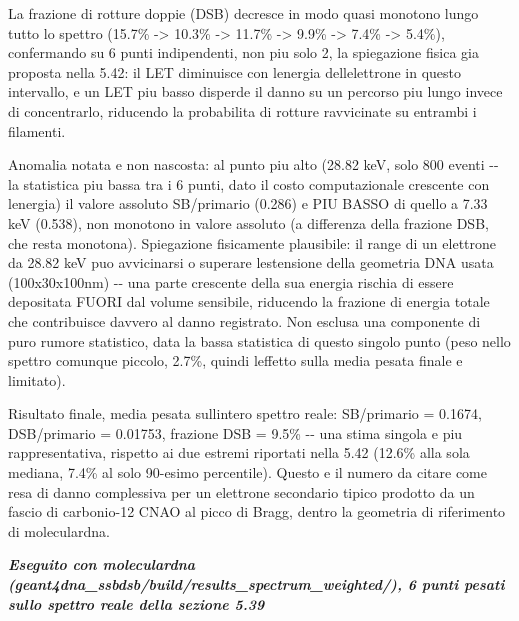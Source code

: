 \documentclass[
  italian,
]{article}
\begin{document}
La frazione di rotture doppie (DSB) decresce in modo quasi monotono lungo tutto lo spettro (15.7\% -\textgreater{} 10.3\% -\textgreater{} 11.7\% -\textgreater{} 9.9\% -\textgreater{} 7.4\% -\textgreater{} 5.4\%), confermando su 6 punti indipendenti, non piu\textquotesingle{} solo 2, la spiegazione fisica gia\textquotesingle{} proposta nella 5.42: il LET diminuisce con l\textquotesingle energia dell\textquotesingle elettrone in questo intervallo, e un LET piu\textquotesingle{} basso disperde il danno su un percorso piu\textquotesingle{} lungo invece di concentrarlo, riducendo la probabilita\textquotesingle{} di rotture ravvicinate su entrambi i filamenti.

Anomalia notata e non nascosta: al punto piu\textquotesingle{} alto (28.82 keV, solo 800 eventi -\/- la statistica piu\textquotesingle{} bassa tra i 6 punti, dato il costo computazionale crescente con l\textquotesingle energia) il valore assoluto SB/primario (0.286) e\textquotesingle{} PIU\textquotesingle{} BASSO di quello a 7.33 keV (0.538), non monotono in valore assoluto (a differenza della frazione DSB, che resta monotona). Spiegazione fisicamente plausibile: il range di un elettrone da 28.82 keV puo\textquotesingle{} avvicinarsi o superare l\textquotesingle estensione della geometria DNA usata (100x30x100nm) -\/- una parte crescente della sua energia rischia di essere depositata FUORI dal volume sensibile, riducendo la frazione di energia totale che contribuisce davvero al danno registrato. Non esclusa una componente di puro rumore statistico, data la bassa statistica di questo singolo punto (peso nello spettro comunque piccolo, 2.7\%, quindi l\textquotesingle effetto sulla media pesata finale e\textquotesingle{} limitato).

Risultato finale, media pesata sull\textquotesingle intero spettro reale: SB/primario = 0.1674, DSB/primario = 0.01753, frazione DSB = 9.5\% -\/- una stima singola e piu\textquotesingle{} rappresentativa, rispetto ai due estremi riportati nella 5.42 (12.6\% alla sola mediana, 7.4\% al solo 90-esimo percentile). Questo e\textquotesingle{} il numero da citare come resa di danno complessiva per un elettrone secondario tipico prodotto da un fascio di carbonio-12 CNAO al picco di Bragg, dentro la geometria di riferimento di moleculardna.

\emph{\textbf{Eseguito con moleculardna (geant4dna\_\allowbreak{}ssbdsb/build/results\_\allowbreak{}spectrum\_\allowbreak{}weighted/), 6 punti pesati sullo spettro reale della sezione 5.39}}
\end{document}
